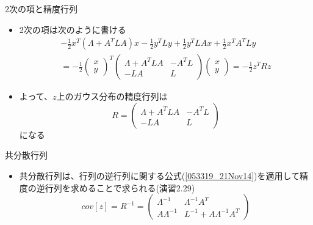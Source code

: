\begin{frame}{2次の項と精度行列}
 \begin{itemize}
  \item 2次の項は次のように書ける
        \begin{eqnarray}
         -\frac{1}{2}x^T(\Lambda+A^TLA)x -\frac{1}{2}y^TLy+\frac{1}{2}y^TLAx+\frac{1}{2}x^TA^TLy \nonumber \\
         = -\frac{1}{2}
          \begin{pmatrix}
           x \\
           y
          \end{pmatrix}^T
          \begin{pmatrix}
           \Lambda+A^TLA & -A^TL\\
           -LA & L
          \end{pmatrix}
          \begin{pmatrix}
           x \\
           y
          \end{pmatrix}
          = -\frac{1}{2}z^TRz
        \end{eqnarray}
  \item よって、$z$上のガウス分布の精度行列は
        \begin{equation}
         R=
          \begin{pmatrix}
           \Lambda+A^TLA & -A^TL\\
           -LA & L
          \end{pmatrix}
        \end{equation}
        になる
 \end{itemize}
\end{frame}

\begin{frame}{共分散行列}
 \begin{itemize}
  \item 共分散行列は、行列の逆行列に関する公式(\ref{053319_21Nov14})を適用して精度の逆行列を求めることで求られる(演習2.29)
        \begin{equation}
         cov[z]=R^{-1}=
          \begin{pmatrix}
           \Lambda^{-1} & \Lambda^{-1}A^T \\
           A\Lambda^{-1} & L^{-1} + A\Lambda^{-1}A^T
          \end{pmatrix}\label{054122_21Nov14}
        \end{equation}
 \end{itemize}
\end{frame}

